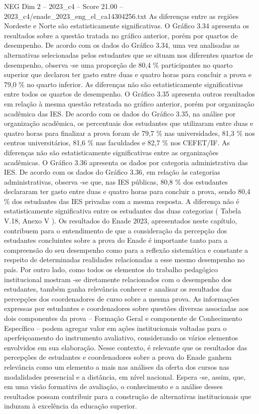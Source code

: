 \begin{textsample}{NEG Dim 2 – 2023\_c4 – Score 21.00 – 2023\_c4/enade\_2023\_eng\_el\_ca14304256.txt}
As diferenças entre as regiões Nordeste e Norte são estatisticamente significativas.
O Gráfico 3.34 apresenta os resultados sobre a questão tratada no gráfico anterior, porém por quartos de desempenho.
De acordo com os dados do Gráfico 3.34, uma vez analisadas as alternativas selecionadas pelos estudantes que se situam nos diferentes quartos de desempenho, observa -se uma proporção de 80,4 \% participantes no quarto superior que declarou ter gasto entre duas e quatro horas para concluir a prova e 79,0 \% no quarto inferior.
As diferenças não são estatisticamente significativas entre todos os quartos de desempenho.
O Gráfico 3.35 apresenta outros resultados em relação à mesma questão retratada no gráfico anterior, porém por organização acadêmica das IES.
De acordo com os dados do Gráfico 3.35, na análise por organização acadêmica, os percentuais dos estudantes que utilizaram entre duas e quatro horas para finalizar a prova foram de 79,7 \% nas universidades, 81,3 \% nos centros universitários, 81,6 \% nas faculdades e 82,7 \% nos CEFET/IF.
As diferenças não são estatisticamente significativas entre as organizações acadêmicas.
O Gráfico 3.36 apresenta os dados por categoria administrativa das IES.
De acordo com os dados do Gráfico 3.36, em relação às categorias administrativas, observa -se que, nas IES públicas, 80,8 \% dos estudantes declararam ter gasto entre duas e quatro horas para concluir a prova, sendo 80,4 \% dos estudantes das IES privadas com a mesma resposta.
A diferença não é estatisticamente significativa entre os estudantes das duas categorias ( Tabela V.18, Anexo V ).
Os resultados do Enade 2023, apresentados neste capítulo, contribuem para o entendimento de que a consideração da percepção dos estudantes concluintes sobre a prova do Enade é importante tanto para a compreensão do seu desempenho como para a reflexão sistemática e constante a respeito de determinadas realidades relacionadas a esse mesmo desempenho no país.
Por outro lado, como todos os elementos do trabalho pedagógico institucional mostram -se diretamente relacionados com o desempenho dos estudantes, também ganha relevância conhecer e analisar os resultados das percepções dos coordenadores de curso sobre a mesma prova.
As informações expressas por estudantes e coordenadores sobre questões diversas associadas aos dois componentes da prova – Formação Geral e componente de Conhecimento Específico – podem agregar valor em ações institucionais voltadas para o aperfeiçoamento do instrumento avaliativo, considerando os vários elementos envolvidos em sua elaboração.
Nesse contexto, é relevante que os resultados das percepções de estudantes e coordenadores sobre a prova do Enade ganhem relevância como um elemento a mais nas análises da oferta dos cursos nas modalidades presencial e a distância, em nível nacional.
Espera -se, assim, que, em uma visão formativa de avaliação, o conhecimento e a análise desses resultados possam contribuir para a construção de alternativas institucionais que induzam à excelência da educação superior.

\end{textsample}
